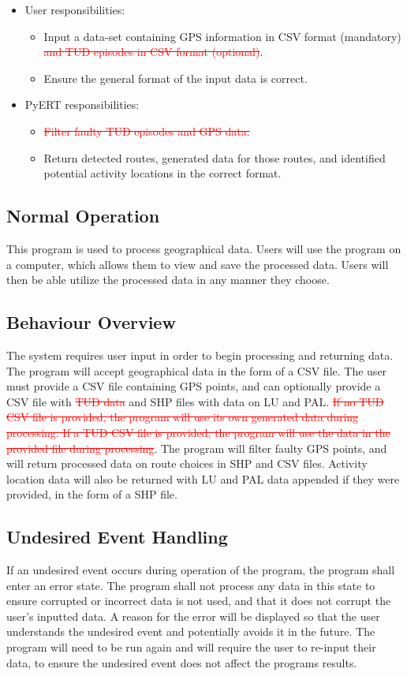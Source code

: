 \documentclass[12pt, titlepage]{article}
\begin{document}
\begin{itemize}
\item User responsibilities: 
    \begin{itemize}
        \item Input a data-set containing GPS information in CSV format (mandatory) \textcolor{red}{\sout{and TUD episodes in CSV format (optional)}}.
        \item Ensure the general format of the input data is correct.
    \end{itemize}
    
    \item PyERT responsibilities: 
        \begin{itemize}
        \item \textcolor{red}{\sout{Filter faulty TUD episodes and GPS data.}}
        \item Return detected routes, generated data for those routes, and identified potential activity locations in the correct format.
        \end{itemize}
\end{itemize}

\subsection{Normal Operation}
This program is used to process geographical data. Users will use the program on a computer, which allows them to view and save the processed data. Users will then be able utilize the processed data in any manner they choose.
\subsection{Behaviour Overview}
The system requires user input in order to begin processing and returning data. The program will accept geographical data in the form of a CSV file. The user must provide a CSV file containing GPS points, and can optionally provide a CSV file with \textcolor{red}{\sout{TUD data}} and SHP files with data on LU and PAL.  \textcolor{red}{\sout{If no TUD CSV file is provided, the program will use its own generated data during processing. If a TUD CSV file is provided, the program will use the data in the provided file during processing}}. The program will filter faulty GPS points, and will return processed data on route choices in SHP and CSV files. Activity location data will also be returned with LU and PAL data appended if they were provided, in the form of a SHP file.
\subsection{Undesired Event Handling}
If an undesired event occurs during operation of the program, the program shall enter an error state. The program shall not process any data in this state to ensure corrupted or incorrect data is not used, and that it does not corrupt the user's inputted data. A reason for the error will be displayed so that the user understands the undesired event and potentially avoids it in the future. The program will need to be run again and will require the user to re-input their data, to ensure the undesired event does not affect the programs results.
\end{document}

